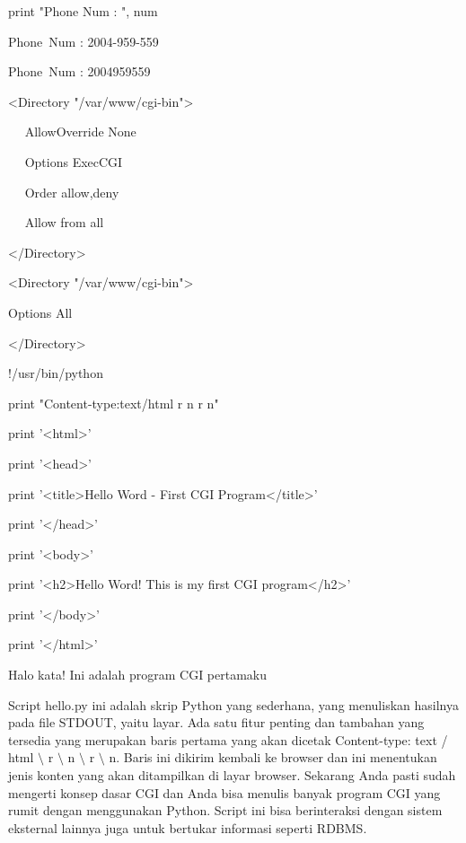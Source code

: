 \begin{12pt}
\begin{12pt}
\begin{12pt}
\begin{12pt}
\begin{12pt}
\noindent 
print "Phone Num : ", num \par
\begin{12pt}
\item 
Phone~Num :  2004-959-559 \par
\noindent 
Phone~Num :  2004959559 \par
\begin{12pt}
\noindent 
<Directory "/var/www/cgi-bin"> \par
\noindent 
~~ AllowOverride None \par
\noindent 
~~ Options ExecCGI \par
\noindent 
~~ Order allow,deny \par
\noindent 
~~ Allow from all \par
\noindent 
</Directory> \par
\vspace{12pt}
\noindent 
<Directory "/var/www/cgi-bin"> \par
\noindent 
Options All \par
\noindent 
</Directory> \par
\vspace{12pt}
\noindent 
!/usr/bin/python \par
\vspace{12pt}
\noindent 
print "Content-type:text/html   \setminus  r   \setminus  n   \setminus  r   \setminus  n" \par
\noindent 
print '<html>' \par
\noindent 
print '<head>' \par
\noindent 
print '<title>Hello Word - First CGI Program</title>' \par
\noindent 
print '</head>' \par
\noindent 
print '<body>' \par
\noindent 
print '<h2>Hello Word! This is my first CGI program</h2>' \par
\noindent 
print '</body>' \par
\noindent 
print '</html>' \par
\vspace{12pt}
\vspace{12pt}
\noindent 
Halo kata! Ini adalah program CGI pertamaku \par
\vspace{12pt}
Script hello.py ini adalah skrip Python yang sederhana, yang menuliskan hasilnya pada file STDOUT, yaitu layar. Ada satu fitur penting dan tambahan yang tersedia yang merupakan baris pertama yang akan dicetak Content-type: text / html  $  \setminus  $ r  $  \setminus  $ n  $  \setminus  $ r  $  \setminus  $ n. Baris ini dikirim kembali ke browser dan ini menentukan jenis konten yang akan ditampilkan di layar browser. Sekarang Anda pasti sudah mengerti konsep dasar CGI dan Anda bisa menulis banyak program CGI yang rumit dengan menggunakan Python. Script ini bisa berinteraksi dengan sistem eksternal lainnya juga untuk bertukar informasi seperti RDBMS. \par

\end{12pt}
\end{12pt}
\end{12pt}
\end{12pt}
\end{12pt}
\end{12pt}
\end{12pt}
